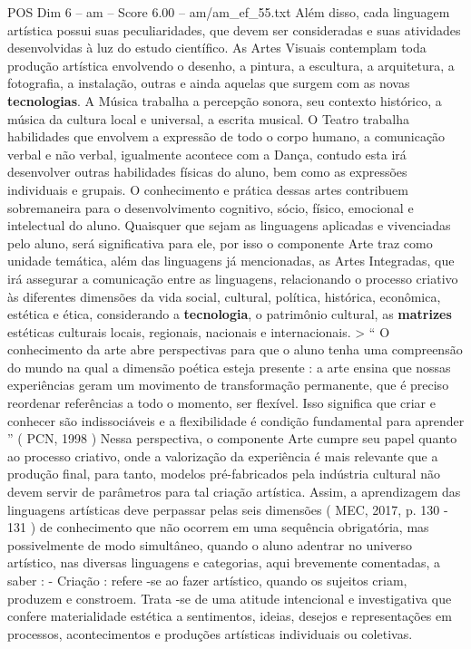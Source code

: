 \begin{textsample}{POS Dim 6 – am – Score 6.00 – am/am\_ef\_55.txt}
Além disso, cada linguagem artística possui suas peculiaridades, que devem ser consideradas e suas atividades desenvolvidas à luz do estudo científico.
As Artes Visuais contemplam toda produção artística envolvendo o desenho, a pintura, a escultura, a arquitetura, a fotografia, a instalação, outras e ainda aquelas que surgem com as novas \textbf{tecnologias}.
A Música trabalha a percepção sonora, seu contexto histórico, a música da cultura local e universal, a escrita musical.
O Teatro trabalha habilidades que envolvem a expressão de todo o corpo humano, a comunicação verbal e não verbal, igualmente acontece com a Dança, contudo esta irá desenvolver outras habilidades físicas do aluno, bem como as expressões individuais e grupais.
O conhecimento e prática dessas artes contribuem sobremaneira para o desenvolvimento cognitivo, sócio, físico, emocional e intelectual do aluno.
Quaisquer que sejam as linguagens aplicadas e vivenciadas pelo aluno, será significativa para ele, por isso o componente Arte traz como unidade temática, além das linguagens já mencionadas, as Artes Integradas, que irá assegurar a comunicação entre as linguagens, relacionando o processo criativo às diferentes dimensões da vida social, cultural, política, histórica, econômica, estética e ética, considerando a \textbf{tecnologia}, o patrimônio cultural, as \textbf{matrizes} estéticas culturais locais, regionais, nacionais e internacionais. > “ O conhecimento da arte abre perspectivas para que o aluno tenha uma compreensão do mundo na qual a dimensão poética esteja presente : a arte ensina que nossas experiências geram um movimento de transformação permanente, que é preciso reordenar referências a todo o momento, ser flexível.
Isso significa que criar e conhecer são indissociáveis e a flexibilidade é condição fundamental para aprender ” ( PCN, 1998 ) Nessa perspectiva, o componente Arte cumpre seu papel quanto ao processo criativo, onde a valorização da experiência é mais relevante que a produção final, para tanto, modelos pré-fabricados pela indústria cultural não devem servir de parâmetros para tal criação artística.
Assim, a aprendizagem das linguagens artísticas deve perpassar pelas seis dimensões ( MEC, 2017, p. 130 - 131 ) de conhecimento que não ocorrem em uma sequência obrigatória, mas possivelmente de modo simultâneo, quando o aluno adentrar no universo artístico, nas diversas linguagens e categorias, aqui brevemente comentadas, a saber : - Criação : refere -se ao fazer artístico, quando os sujeitos criam, produzem e constroem.
Trata -se de uma atitude intencional e investigativa que confere materialidade estética a sentimentos, ideias, desejos e representações em processos, acontecimentos e produções artísticas individuais ou coletivas.

\end{textsample}
